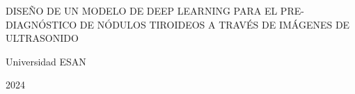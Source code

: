 \begin{center}
	{DISEÑO DE UN MODELO DE DEEP LEARNING PARA EL PRE-DIAGNÓSTICO DE NÓDULOS TIROIDEOS A TRAVÉS DE IMÁGENES DE ULTRASONIDO}
\end{center}

\vspace{3cm}

\rightline{\fillin[9cm]}
\vspace{3cm}

\rightline{\fillin[9cm]}
\vspace{3cm}

\rightline{\fillin[9cm]}
\vspace{3cm}

\centerline{Universidad ESAN}
\centerline{2024}